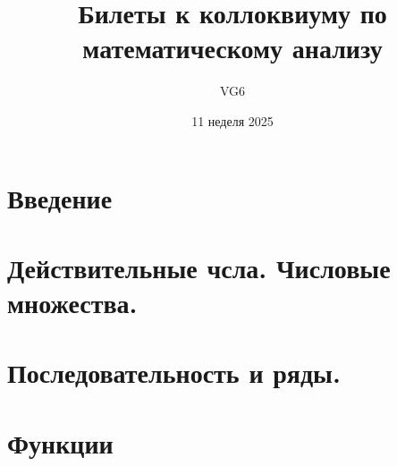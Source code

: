 \documentclass[12pt, a4paper]{article}
\title{Билеты к коллоквиуму по математическому анализу}
\author{VG6}
\date{11 неделя 2025}
\begin{document}
\maketitle
\tableofcontents
\newpage

\section{Введение}



\section{Действительные чсла. Числовые множества.}


\section{Последовательность и ряды.}




























\section{Функции}










\end{document}
